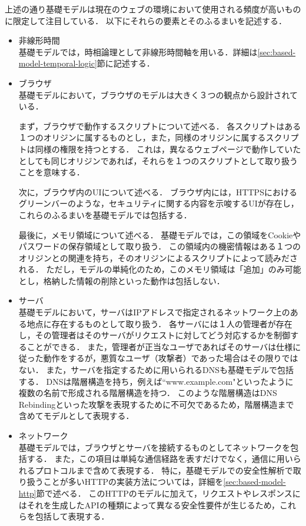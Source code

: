 \documentclass[12pt,a4paper]{jbook}
\begin{document}
上述の通り基礎モデルは現在のウェブの環境において使用される頻度が高いものに限定して注目している．
以下にそれらの要素とそのふるまいを記述する．
\begin{itemize}
\item 非線形時間 \\
基礎モデルでは，時相論理として非線形時間軸を用いる．詳細は\ref{sec:based-model-temporal-logic}節に記述する．
\item ブラウザ \\
基礎モデルにおいて，ブラウザのモデルは大きく３つの観点から設計されている．

まず，ブラウザで動作するスクリプトについて述べる．
各スクリプトはある１つのオリジンに属するものとし，また，同様のオリジンに属するスクリプトは同様の権限を持つとする．
これは，異なるウェブページで動作していたとしても同じオリジンであれば，それらを１つのスクリプトとして取り扱うことを意味する．

次に，ブラウザ内のUIについて述べる．
ブラウザ内には，HTTPSにおけるグリーンバーのような，セキュリティに関する内容を示唆するUIが存在し，これらのふるまいを基礎モデルでは包括する．

最後に，メモリ領域について述べる．
基礎モデルでは，この領域をCookieやパスワードの保存領域として取り扱う．
この領域内の機密情報はある１つのオリジンとの関連を持ち，そのオリジンによるスクリプトによって読みだされる．
ただし，モデルの単純化のため，このメモリ領域は「追加」のみ可能とし，格納した情報の削除といった動作は包括しない．
\item サーバ \\
基礎モデルにおいて，サーバはIPアドレスで指定されるネットワーク上のある地点に存在するものとして取り扱う．
各サーバには１人の管理者が存在し，その管理者はそのサーバがリクエストに対してどう対応するかを制御することができる．
また，管理者が正当なユーザであればそのサーバは仕様に従った動作をするが，悪質なユーザ（攻撃者）であった場合はその限りではない．
また，サーバを指定するために用いられるDNSも基礎モデルで包括する．
DNSは階層構造を持ち，例えば``www.example.com"といったように複数の名前で形成される階層構造を持つ．
このような階層構造はDNS Rebinding\cite{dns-rebinding}といった攻撃を表現するために不可欠であるため，階層構造まで含めてモデルとして表現する．
\item ネットワーク \\
基礎モデルでは，ブラウザとサーバを接続するものとしてネットワークを包括する．
また，この項目は単純な通信経路を表すだけでなく，通信に用いられるプロトコルまで含めて表現する．
特に，基礎モデルでの安全性解析で取り扱うことが多いHTTPの実装方法については，詳細を\ref{sec:based-model-http}節で述べる．
このHTTPのモデルに加えて，リクエストやレスポンスにはそれを生成したAPIの種類によって異なる安全性要件が生じるため，これらを包括して表現する．
\end{itemize}
\end{document}
